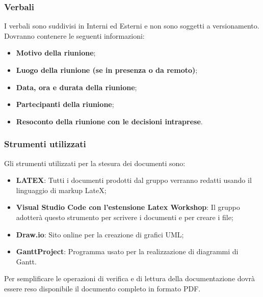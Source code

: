 \subsubsection{Verbali}
I verbali sono suddivisi in Interni ed Esterni e non sono soggetti a versionamento. \\
Dovranno contenere le seguenti informazioni:
\begin{itemize}
    \item \textbf{Motivo della riunione};
    \item \textbf{Luogo della riunione (se in presenza o da remoto)};
    \item \textbf{Data, ora e durata della riunione};
    \item \textbf{Partecipanti della riunione};
    \item \textbf{Resoconto della riunione con le decisioni intraprese}.
\end{itemize}

\subsubsection{Strumenti utilizzati}
Gli strumenti utilizzati per la stesura dei documenti sono:
\begin{itemize}
    \item \textbf{LATEX}: Tutti i documenti prodotti dal gruppo verranno redatti usando il linguaggio di markup LateX;
    \item \textbf{Visual Studio Code con l’estensione Latex Workshop}: Il gruppo adotterà questo strumento per scrivere i documenti e per creare i file;
    \item \textbf{Draw.io}: Sito online per la creazione di grafici UML;
    \item \textbf{GanttProject}: Programma usato per la realizzazione di diagrammi di Gantt.
\end{itemize}
Per semplificare le operazioni di verifica e di lettura della documentazione dovrà essere reso disponibile il documento completo in formato PDF.

